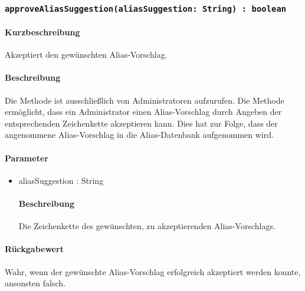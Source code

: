 \subsubsection{\texttt{approveAliasSuggestion(aliasSuggestion: String) : boolean}}%
\paragraph*{Kurzbeschreibung}
Akzeptiert den gewünschten Alias-Vorschlag.
\paragraph*{Beschreibung}
Die Methode ist ausschließlich von Administratoren aufzurufen.
Die Methode ermöglicht, dass ein Administrator einen Alias-Vorschlag durch Angeben der entsprechenden Zeichenkette akzeptieren kann.
Dies hat zur Folge, dass der angenommene Alias-Vorschlag in die Alias-Datenbank aufgenommen wird.
\paragraph*{Parameter}
\begin{itemize}
	\item aliasSuggestion : String
		\paragraph*{Beschreibung}
		Die Zeichenkette des gewünschten, zu akzeptierenden Alias-Vorschlags.
\end{itemize}
\paragraph*{Rückgabewert}
Wahr, wenn der gewünschte Alias-Vorschlag erfolgreich akzeptiert werden konnte, ansonsten falsch.

